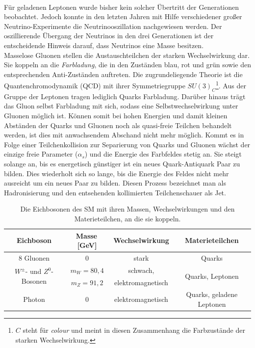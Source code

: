 \\
F\"ur geladenen Leptonen wurde bisher kein solcher \"Ubertritt der Generationen beobachtet. Jedoch konnte in den letzten Jahren mit Hilfe verschiedener gro\ss{}er Neutrino-Experimente die Neutrinooszillation nachgewiesen werden. Der oszillierende \"Ubergang der Neutrinos in den drei Generationen ist der entscheidende Hinweis darauf, dass Neutrinos eine Masse besitzen.  
\\
Masselose Gluonen stellen die Austauschteilchen der starken Wechselwirkung dar. Sie koppeln an die \textit{Farbladung}, die in den Zust\"anden blau, rot und gr\"un sowie den entsprechenden Anti-Zust\"anden auftreten. Die zugrundeliegende Theorie ist die Quantenchromodynamik (QCD) mit ihrer Symmetriegruppe $SU(3)_{C}$\footnote{$C$ steht f\"ur \textit{colour} und meint in diesen Zusammenhang die Farbzust\"ande der starken Wechselwirkung.}. Aus der Gruppe der Leptonen tragen lediglich Quarks Farbladung. Dar\"uber hinaus tr\"agt das Gluon selbst Farbladung mit sich, sodass eine Selbstwechselwirkung unter Gluonen m\"oglich ist. Können somit bei hohen Energien und damit kleinen Abst\"anden der Quarks und Gluonen noch als quasi-freie Teilchen behandelt werden, ist dies mit anwachsendem Abschand nicht mehr möglich. Kommt es in Folge einer Teilchenkollision zur Separierung von Quarks und Gluonen wächst der einzige freie Parameter ($\alpha_{s}$) und die Energie des Farbfeldes stetig an. Sie steigt solange an, bis es energetisch g\"unstiger ist ein neues Quark-Antiquark Paar zu bilden. Dies wiederholt sich so lange, bis die Energie des Feldes nicht mehr ausreicht um ein neues Paar zu bilden. Diesen Prozess bezeichnet man als Hadronisierung und den entsehenden kollimierten Teilchenschauer als Jet. 
\\
\begin{table}[tp]
\centering
\begin{tabular}{c||c|c|c}
Eichboson & Masse\,[GeV] & Wechselwirkung & Materieteilchen \\ \hline\hline
8 Gluonen & 0 & stark & Quarks \\ \hline
\multirow{2}{*}{$W^{\pm}$- und $Z^{0}$-Bosonen} & $m_{W}=80,4$ & schwach, & \multirow{2}{*}{Quarks, Leptonen} \\
 & $m_{Z}=91,2$ & elektromagnetisch & \\ \hline
Photon & 0 & elektromagnetisch & Quarks, geladene Leptonen\\ \hline
\end{tabular}
	  	\caption{Die Eichbosonen des SM mit ihren Massen, Wechselwirkungen und den Materie\-teilchen, an die sie koppeln.}
	  		\label{Eichbosonen}
\end{table}


